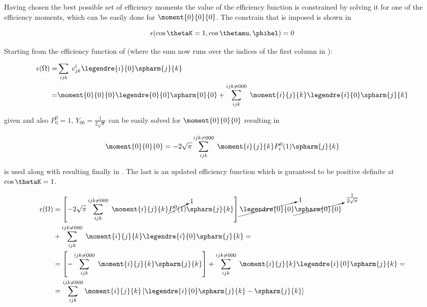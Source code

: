 Having chosen the best possible set of efficiency moments the value of the efficiency function is constrained by solving it for
one of the efficiency moments, which can be easily done for $\moment{0}{0}{0}$. The constrain that is imposed is shown in 

\begin{center}
\begin{equation}
  \epsilon(\cos\thetaK = 1, \cos\thetamu, \phihel) = 0 
  \label{eff_func_constr}
\end{equation}
\end{center}

\noindent Starting from the efficiency function of  (where the sum now runs over the indices of the first column in ):

\begin{center}
\begin{align}
  \epsilon(\Omega) =& \sum_{ijk} \; c^i_{jk} \legendre{i}{0} \spharm{j}{k} \nonumber \\
                   =& \moment{0}{0}{0} \legendre{0}{0} \spharm{0}{0} + \sum_{ijk}^{ijk\neq 000} \; \moment{i}{j}{k} \legendre{i}{0} \spharm{j}{k}
  \label{eff_func_rewriten}
\end{align}
\end{center}

\noindent given  and also $P_{0}^{0}=1$,  $Y_{00} = \frac{1}{2\sqrt{\pi}}$  can be 
easily solved for $\moment{0}{0}{0}$ resulting in 

\begin{center}
\begin{equation}
  \moment{0}{0}{0} = -2\sqrt{\pi} \sum_{ijk}^{ijk\neq 000} \; \moment{i}{j}{k} P_i^0(1) \spharm{j}{k}
  \label{eff_constr_mom}
\end{equation}
\end{center}

\noindent {} is used along with  resulting finally in . 
The last is an updated efficiency function which is guranteed to be positive definite at $\cos\thetaK=1$. 

\begin{center}
\begin{align}
  \epsilon(\Omega) &= \left[-2\sqrt{\pi} \sum_{ijk}^{ijk\neq 000} \; \moment{i}{j}{k} \cancelto{1}{P_i^0(1)} \spharm{j}{k} \right] \cancelto{1}{\legendre{0}{0}} \cancelto{\frac{1}{2\sqrt{\pi}}}{\spharm{0}{0}} \nonumber \\ 
                   &+ \sum_{ijk}^{ijk\neq 000} \; \moment{i}{j}{k} \legendre{i}{0} \spharm{j}{k} = \nonumber \\
                   &= \left[- \sum_{ijk}^{ijk\neq 000} \; \moment{i}{j}{k} \spharm{j}{k} \right] + \sum_{ijk}^{ijk\neq 000} \; \moment{i}{j}{k} \legendre{i}{0} \spharm{j}{k} = \nonumber\\
                   &= \sum_{ijk}^{ijk\neq 000} \moment{i}{j}{k} \left[ \legendre{i}{0} \spharm{j}{k} - \spharm{j}{k} \right]
  \label{eff_func_final}
\end{align}
\end{center}

